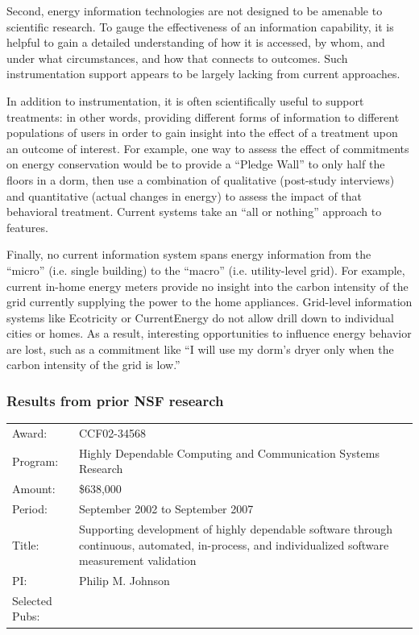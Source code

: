 Second, energy information technologies are not designed to be amenable to
scientific research.  To gauge the effectiveness of an information
capability, it is helpful to gain a detailed understanding of how it is
accessed, by whom, and under what circumstances, and how that connects
to outcomes.  Such instrumentation support appears to be largely lacking
from current approaches.

In addition to instrumentation, it is often scientifically useful to
support treatments: in other words, providing different forms of
information to different populations of users in order to gain insight into
the effect of a treatment upon an outcome of interest. For example, one way
to assess the effect of commitments on energy conservation would be to
provide a ``Pledge Wall'' to only half the floors in a dorm, then use a
combination of qualitative (post-study interviews) and quantitative (actual
changes in energy) to assess the impact of that behavioral
treatment. Current systems take an ``all or nothing'' approach to
features. 

Finally, no current information system spans energy information from the ``micro''
(i.e. single building) to the ``macro'' (i.e. utility-level grid).  For
example, current in-home energy meters provide no insight into the carbon
intensity of the grid currently supplying the power to the home appliances.
Grid-level information systems like Ecotricity or CurrentEnergy do not
allow drill down to individual cities or homes.  As a result, interesting
opportunities to influence energy behavior are lost, such as a commitment
like ``I will use my dorm's dryer only when the carbon intensity of the
grid is low.''

\subsubsection{Results from prior NSF research}

\small
\begin{tabular}{p{1in}p{5in}}
Award: & CCF02-34568 \\ 
Program: & Highly Dependable Computing and Communication Systems Research\\ 
Amount: & \$638,000 \\ 
Period: & September 2002 to September 2007 \\ 
Title: & Supporting development of highly dependable software through
continuous, automated, in-process, and individualized software measurement validation \\ 
PI: & Philip M. Johnson \\ 
Selected Pubs: & \cite{csdl2-04-22,csdl2-04-13,csdl2-04-11,csdl2-03-12,
csdl2-02-07,csdl2-03-07,csdl2-04-02,csdl2-04-04,csdl2-04-11,csdl2-06-07,csdl2-06-08,csdl2-06-13,csdl2-06-06,csdl2-09-01}
\end{tabular} \\ %
\normalsize

